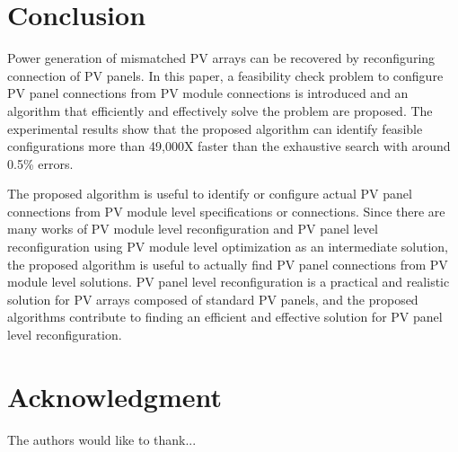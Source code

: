 \documentclass[journal]{IEEEtran}
\begin{document}
\section{Conclusion}\label{sec:conclusion}
Power generation of mismatched PV arrays can be recovered by reconfiguring connection of PV panels.
In this paper, a feasibility check problem to configure PV panel connections from PV module connections is introduced and an algorithm that efficiently and effectively solve the problem are proposed.
The experimental results show that the proposed algorithm can identify feasible configurations more than 49,000X faster than the exhaustive search with around 0.5\% errors.

The proposed algorithm is useful to identify or configure actual PV panel connections from PV module level specifications or connections.
Since there are many works of PV module level reconfiguration and PV panel level reconfiguration using PV module level optimization as an intermediate solution, the proposed
algorithm is useful to actually find PV panel connections from PV module level solutions.
PV panel level reconfiguration is a practical and realistic solution for PV arrays composed of standard PV panels, and the proposed algorithms contribute to finding an efficient and effective solution for PV panel level reconfiguration.
\appendices
\section*{Acknowledgment}


The authors would like to thank...






\end{document}
